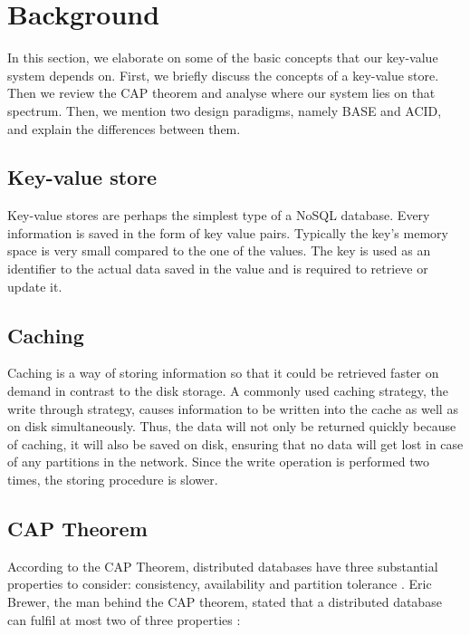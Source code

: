 \section{Background}
\label{sec:background}
In this section, we elaborate on some of the basic concepts that our key-value system depends on. First, we briefly discuss the concepts of a key-value store. Then we review the CAP theorem and analyse where our system lies on that spectrum. Then, we mention two design paradigms, namely BASE and ACID, and explain the differences between them.

\subsection{Key-value store}
Key-value stores are perhaps the simplest type of a NoSQL database. Every information is saved in the form of key value pairs. Typically the key’s memory space is very small compared to the one of the values. The key is used as an identifier to the actual data saved in the value and is required to retrieve or update it.

\subsection{Caching}
\label{sec:caching}
Caching is a way of storing information so that it could be retrieved faster on demand in contrast to the disk storage. A commonly used caching strategy, the write through strategy, causes information to be written into the cache as well as on disk simultaneously. Thus, the data will not only be returned quickly because of caching, it will also be saved on disk, ensuring that no data will get lost in case of any partitions in the network. Since the write operation is performed two times, the storing procedure is slower.

\subsection{CAP Theorem}
\label{sec:background_cap} 
According to the CAP Theorem, distributed databases have three substantial properties to consider: consistency, availability and partition tolerance \cite{brewer2012cap}. Eric Brewer, the man behind the CAP theorem, stated that a distributed database can fulfil at most two of three properties \cite{brewer2000cap}:

